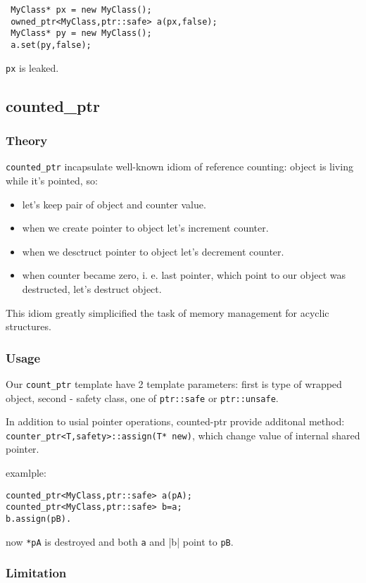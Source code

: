 \documentclass[10pt]{article}
\begin{document}
\begin{verbatim}
 MyClass* px = new MyClass();
 owned_ptr<MyClass,ptr::safe> a(px,false);
 MyClass* py = new MyClass();
 a.set(py,false); 
\end{verbatim}
 \verb|px| is leaked.

\subsection{ counted\_ptr }

\subsubsection{ Theory }

 \verb|counted_ptr| incapsulate well-known idiom of reference counting: 
object is living while it's pointed, so:
\begin{itemize}
 \item let's keep pair of object and counter value. 
 \item when we create pointer to object let's increment counter.
 \item when we desctruct pointer to object let's decrement counter.
 \item when counter became zero, i. e. last pointer, which point to our object
 was destructed, let's destruct object.
\end{itemize}

 This idiom greatly simplicified the task of memory management for acyclic 
structures.

\subsubsection{ Usage }

 Our \verb|count_ptr| template have 2 template parameters: first is type of
wrapped object, second - safety class, one of \verb|ptr::safe| or 
\verb|ptr::unsafe|.

 In addition to usial pointer operations, counted-ptr provide additonal
method: \verb|counter_ptr<T,safety>::assign(T* new)|, which change value
of internal shared pointer.

examlple:
\begin{verbatim}
counted_ptr<MyClass,ptr::safe> a(pA);
counted_ptr<MyClass,ptr::safe> b=a;
b.assign(pB).
\end{verbatim}
 now \verb|*pA| is destroyed and both \verb|a| and |b| point to \verb|pB|.
  

\subsubsection{ Limitation }
\end{document}
